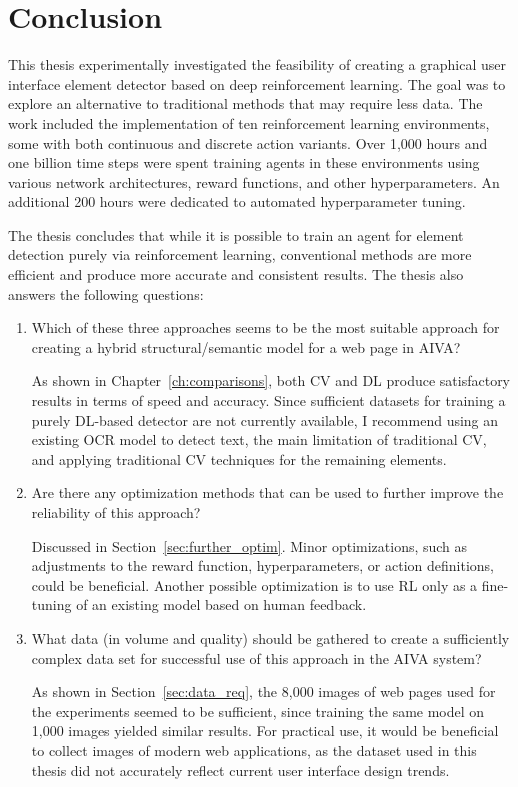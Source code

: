 \documentclass[
  digital,     %
  oneside,     %
  nosansbold,  %
  nocolorbold, %
  lof,         %
  lot,         %
]{fithesis4}
\begin{document}
\newpage

\chapter*{Conclusion}
This thesis experimentally investigated the feasibility of creating a graphical user interface element detector based on deep reinforcement learning. The goal was to explore an alternative to traditional methods that may require less data. The work included the implementation of ten reinforcement learning environments, some with both continuous and discrete action variants. Over 1,000 hours and one billion time steps were spent training agents in these environments using various network architectures, reward functions, and other hyperparameters. An additional 200 hours were dedicated to automated hyperparameter tuning.

The thesis concludes that while it is possible to train an agent for element detection purely via reinforcement learning, conventional methods are more efficient and produce more accurate and consistent results. The thesis also answers the following questions:

\begin{enumerate}
    \item Which of these three approaches seems to be the most suitable approach for creating a hybrid structural/semantic model for a web page in AIVA?

    As shown in Chapter~\ref{ch:comparisons}, both CV and DL produce satisfactory results in terms of speed and accuracy. Since sufficient datasets for training a purely DL-based detector are not currently available, I recommend using an existing OCR model to detect text, the main limitation of traditional CV, and applying traditional CV techniques for the remaining elements.

    \item Are there any optimization methods that can be used to further improve the reliability of this approach?

    Discussed in Section~\ref{sec:further_optim}. Minor optimizations, such as adjustments to the reward function, hyperparameters, or action definitions, could be beneficial. Another possible optimization is to use RL only as a fine-tuning of an existing model based on human feedback.

    \item What data (in volume and quality) should be gathered to create a sufficiently complex data set for successful use of this approach in the AIVA system?

    As shown in Section~\ref{sec:data_req}, the 8,000 images of web pages used for the experiments seemed to be sufficient, since training the same model on 1,000 images yielded similar results. For practical use, it would be beneficial to collect images of modern web applications, as the dataset used in this thesis did not accurately reflect current user interface design trends.
\end{enumerate}
\end{document}

